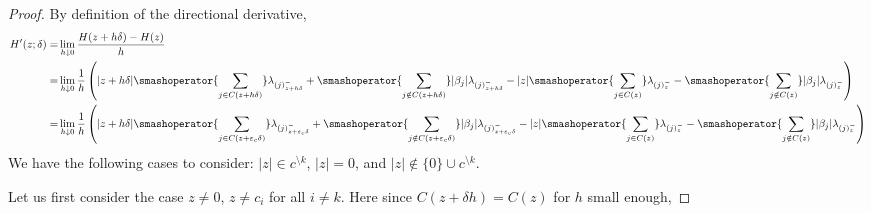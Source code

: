 \begin{proof}\label{app:proof_directional_derivative}
    By definition of the directional derivative,
    \begin{align}
      H'(z; \delta)
      = & \lim_{h \downarrow 0} \frac{H(z + h \delta) - H(z)}{h} \nonumber \\
      = &
      \lim_{h \downarrow 0} \frac{1}{h}
      \left(
        |z + h \delta| \smashoperator{\sum_{j \in C(z + h \delta)}} \lambda_{(j)^-_{z + h \delta}}
        + \smashoperator{\sum_{j \notin C(z + h\delta)}} |\beta_j| \lambda_{(j)^-_{z + h \delta}}
        - |z| \smashoperator{\sum_{j \in C(z)}} \lambda_{(j)^-_z}
        - \smashoperator{\sum_{j \notin C(z)}} |\beta_j| \lambda_{(j)^-_z}
      \right) \nonumber                                                          \\
      = & \lim_{h \downarrow 0}
      \frac{1}{h}
      \left(
        |z + h \delta| \smashoperator{\sum_{j \in C(z + {\varepsilon_c}\delta)}} \lambda_{(j)^-_{z + {\varepsilon_c}\delta}}
        + \smashoperator{\sum_{j \notin C(z + {\varepsilon_c}\delta)}} |\beta_j| \lambda_{(j)^-_{z + {\varepsilon_c}\delta}}
        - |z| \smashoperator{\sum_{j \in C(z)}} \lambda_{(j)^-_{z}}
        - \smashoperator{\sum_{j \notin C(z)}} |\beta_j| \lambda_{(j)^-_{z}}
      \right)
      \label{eq:directional-derivative-sl1}
    \end{align}
    We have the following cases to consider: \(|z| \in c^{\setminus k}\),
    \(|z| = 0\), and \(|z| \notin \{0\} \cup c^{\setminus k}\).


    Let us first consider the case
    $z \neq 0$, $z \neq c_i$ for all $i \neq k$.
    Here since \(C(z + \delta h) = C(z)\) for $h$ small enough,


\end{proof}
